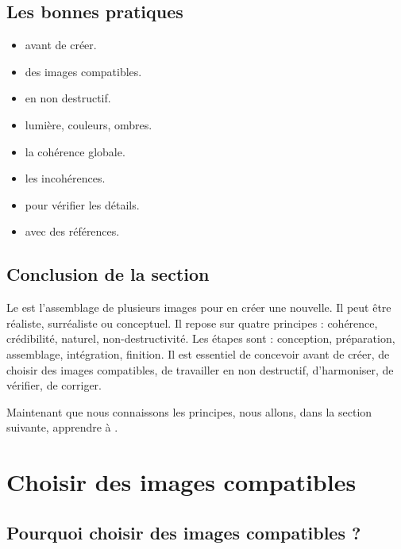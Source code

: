 \subsection{Les bonnes pratiques}

\begin{itemize}
    \item {} avant de créer.
    \item {} des images compatibles.
    \item {} en non destructif.
    \item {} lumière, couleurs, ombres.
    \item {} la cohérence globale.
    \item {} les incohérences.
    \item {} pour vérifier les détails.
    \item {} avec des références.
\end{itemize}

\subsection*{Conclusion de la section}

Le  est l'assemblage de plusieurs images pour en créer une nouvelle. Il peut être réaliste, surréaliste ou conceptuel. Il repose sur quatre principes : cohérence, crédibilité, naturel, non-destructivité. Les étapes sont : conception, préparation, assemblage, intégration, finition. Il est essentiel de concevoir avant de créer, de choisir des images compatibles, de travailler en non destructif, d'harmoniser, de vérifier, de corriger.

Maintenant que nous connaissons les principes, nous allons, dans la section suivante, apprendre à .

\section{Choisir des images compatibles}

\subsection{Pourquoi choisir des images compatibles ?}

